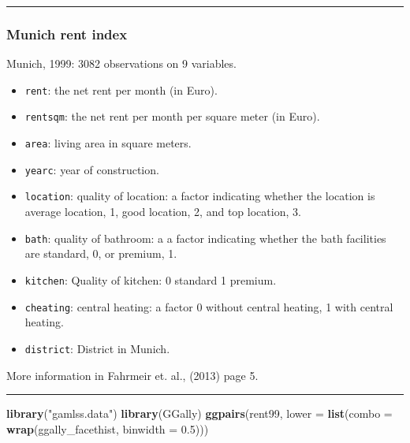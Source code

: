 \documentclass[
]{article}
\newenvironment{Shaded}{\begin{snugshade}}{\end{snugshade}}
\newcommand{\AttributeTok}[1]{\textcolor[rgb]{0.13,0.29,0.53}{#1}}
\newcommand{\FloatTok}[1]{\textcolor[rgb]{0.00,0.00,0.81}{#1}}
\newcommand{\FunctionTok}[1]{\textcolor[rgb]{0.13,0.29,0.53}{\textbf{#1}}}
\newcommand{\NormalTok}[1]{#1}
\newcommand{\StringTok}[1]{\textcolor[rgb]{0.31,0.60,0.02}{#1}}
\providecommand{\tightlist}{%
  \setlength{\itemsep}{0pt}\setlength{\parskip}{0pt}}
\begin{document}
\begin{center}\rule{0.5\linewidth}{0.5pt}\end{center}

\hypertarget{munich-rent-index}{%
\subsubsection{Munich rent index}\label{munich-rent-index}}

Munich, 1999: 3082 observations on 9 variables.

\begin{itemize}
\tightlist
\item
  \texttt{rent}: the net rent per month (in Euro).
\item
  \texttt{rentsqm}: the net rent per month per square meter (in Euro).
\item
  \texttt{area}: living area in square meters.
\item
  \texttt{yearc}: year of construction.
\item
  \texttt{location}: quality of location: a factor indicating whether
  the location is average location, 1, good location, 2, and top
  location, 3.
\item
  \texttt{bath}: quality of bathroom: a a factor indicating whether the
  bath facilities are standard, 0, or premium, 1.
\item
  \texttt{kitchen}: Quality of kitchen: 0 standard 1 premium.
\item
  \texttt{cheating}: central heating: a factor 0 without central
  heating, 1 with central heating.
\item
  \texttt{district}: District in Munich.
\end{itemize}

More information in Fahrmeir et. al., (2013) page 5.

\begin{center}\rule{0.5\linewidth}{0.5pt}\end{center}

\footnotesize

\begin{Shaded}
\begin{Highlighting}[]
\FunctionTok{library}\NormalTok{(}\StringTok{"gamlss.data"}\NormalTok{)}
\FunctionTok{library}\NormalTok{(GGally)}
\FunctionTok{ggpairs}\NormalTok{(rent99, }\AttributeTok{lower =} \FunctionTok{list}\NormalTok{(}\AttributeTok{combo =} \FunctionTok{wrap}\NormalTok{(ggally\_facethist, }\AttributeTok{binwidth =} \FloatTok{0.5}\NormalTok{)))}
\end{Highlighting}
\end{Shaded}
\end{document}
